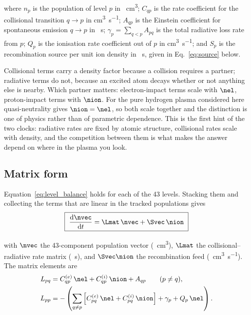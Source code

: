 \noindent where $n_p$ is the population of level $p$ in \si{\per\cubic\centi\metre};
$C_{qp}$ is the rate coefficient for the collisional transition $q \to p$ in
\si{\cubic\centi\metre\per\second}; $A_{qp}$ is the Einstein coefficient for
spontaneous emission $q \to p$ in \si{\per\second}; $\gamma_p = \sum_{q<p}A_{pq}$
is the total radiative loss rate from $p$; $Q_p$ is the ionisation rate
coefficient out of $p$ in \si{\cubic\centi\metre\per\second}; and $S_p$ is the
recombination source per unit ion density in \si{\per\second}, given in
Eq.~\eqref{eq:source} below.

Collisional terms carry a density factor because a collision requires a
partner; radiative terms do not, because an excited atom decays whether or not
anything else is nearby. Which partner matters: electron-impact terms scale with
$\nel$, proton-impact terms with $\nion$. For the pure hydrogen plasma
considered here quasi-neutrality gives $\nion = \nel$, so both scale together and
the distinction is one of physics rather than of parametric dependence. This is the first hint of the
two clocks: radiative rates are fixed by atomic structure, collisional rates
scale with density, and the competition between them is what makes the answer
depend on where in the plasma you look.

\subsection{Matrix form}

Equation~\eqref{eq:level_balance} holds for each of the 43 levels. Stacking
them and collecting the terms that are linear in the tracked populations gives
\begin{equation}
  \boxed{\ \frac{\mathrm{d}\nvec}{\mathrm{d}t} = \Lmat\,\nvec + \Svec\,\nion\ }
  \label{eq:master}
\end{equation}

\noindent with $\nvec$ the 43-component population vector
(\si{\per\cubic\centi\metre}), $\Lmat$ the collisional--radiative rate matrix
(\si{\per\second}), and $\Svec\nion$ the recombination feed
(\si{\per\cubic\centi\metre\per\second}). The matrix elements are
\begin{align}
  L_{pq} &= C^{(e)}_{qp}\,\nel + C^{(i)}_{qp}\,\nion + A_{qp}
            \qquad (p \neq q),
  \label{eq:L_offdiag}\\
  L_{pp} &= -\left(\sum_{q\neq p}
            \left[C^{(e)}_{pq}\,\nel + C^{(i)}_{pq}\,\nion\right]
            + \gamma_p + Q_p\,\nel\right).
  \label{eq:L_diag}
\end{align}

